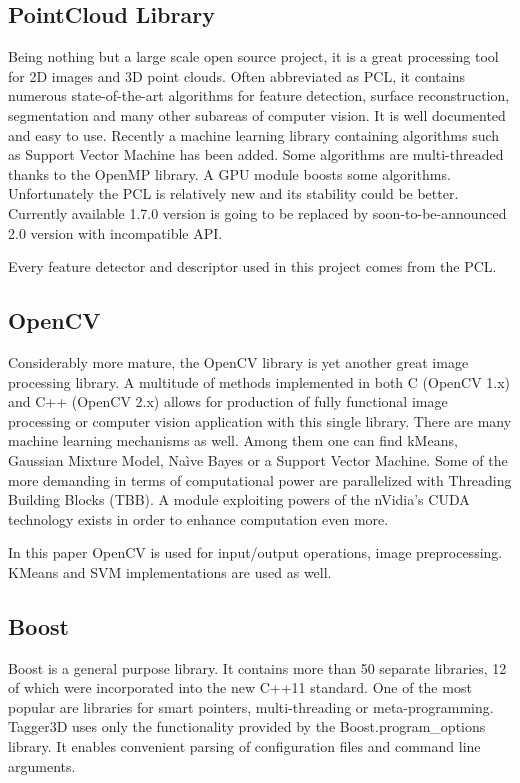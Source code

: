 	\subsection{PointCloud Library}
	Being nothing but a large scale open source project, it is a great processing tool for 2D images and 3D point clouds. Often abbreviated as PCL, it contains numerous state-of-the-art algorithms for feature detection, surface reconstruction, segmentation and many other subareas of computer vision. It is well documented and easy to use. Recently a machine learning library containing algorithms such as Support Vector Machine has been added. Some algorithms are multi-threaded thanks to the OpenMP library. A GPU module boosts some algorithms. Unfortunately the PCL is relatively new and its stability could be better. Currently available 1.7.0 version is going to be replaced by soon-to-be-announced 2.0 version with incompatible API.
	
	Every feature detector and descriptor used in this project comes from the PCL.
	
	\subsection{OpenCV}
	Considerably more mature, the OpenCV library is yet another great image processing library. A multitude of methods implemented in both C (OpenCV 1.x) and C++ (OpenCV 2.x) allows for production of fully functional image processing or computer vision application with this single library. There are many machine learning mechanisms as well. Among them one can find kMeans, Gaussian Mixture Model, Na\`ive Bayes or a Support Vector Machine. Some of the more demanding in terms of computational power are parallelized with Threading Building Blocks (TBB). A module exploiting powers of the nVidia's CUDA technology exists in order to enhance computation even more.
	
	In this paper OpenCV is used for input/output operations, image preprocessing. KMeans and SVM implementations are used as well.
	
	\subsection{Boost}
	Boost is a general purpose library. It contains more than 50 separate libraries, 12 of which were incorporated into the new C++11 standard. One of the most popular are libraries for smart pointers, multi-threading or meta-programming. Tagger3D uses only the functionality provided by the Boost.program\_options library. It enables convenient parsing of configuration files and command line arguments.
		
